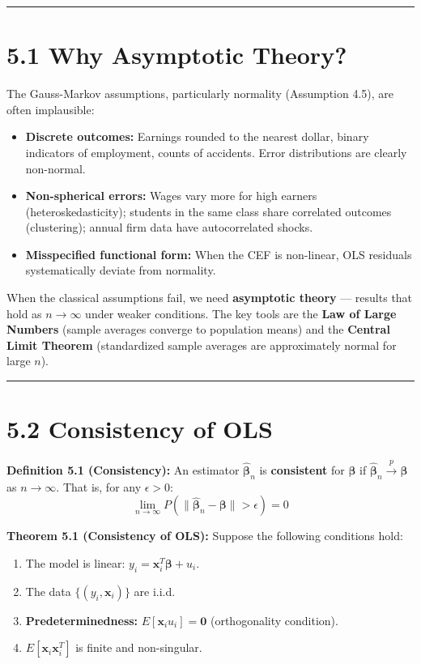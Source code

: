\medskip\hrule\medskip

\section{5.1 Why Asymptotic Theory?}

The Gauss-Markov assumptions, particularly normality (Assumption 4.5), are often implausible:

\begin{itemize}
\item \textbf{Discrete outcomes:} Earnings rounded to the nearest dollar, binary indicators of employment, counts of accidents. Error distributions are clearly non-normal.
\item \textbf{Non-spherical errors:} Wages vary more for high earners (heteroskedasticity); students in the same class share correlated outcomes (clustering); annual firm data have autocorrelated shocks.
\item \textbf{Misspecified functional form:} When the CEF is non-linear, OLS residuals systematically deviate from normality.
\end{itemize}

When the classical assumptions fail, we need \textbf{asymptotic theory} --- results that hold as $n \to \infty$ under weaker conditions. The key tools are the \textbf{Law of Large Numbers} (sample averages converge to population means) and the \textbf{Central Limit Theorem} (standardized sample averages are approximately normal for large $n$).

\medskip\hrule\medskip

\section{5.2 Consistency of OLS}

\textbf{Definition 5.1 (Consistency):} An estimator $\hat{\boldsymbol{\beta}}_n$ is \textbf{consistent} for $\boldsymbol{\beta}$ if $\hat{\boldsymbol{\beta}}_n \xrightarrow{p} \boldsymbol{\beta}$ as $n \to \infty$. That is, for any $\epsilon > 0$:
\[
\lim_{n \to \infty} P(\|\hat{\boldsymbol{\beta}}_n - \boldsymbol{\beta}\| > \epsilon) = 0
\]

\textbf{Theorem 5.1 (Consistency of OLS):} Suppose the following conditions hold:
\begin{enumerate}
\item The model is linear: $y_i = \mathbf{x}_i^T \boldsymbol{\beta} + u_i$.
\item The data $\{(y_i, \mathbf{x}_i)\}$ are i.i.d.
\item \textbf{Predeterminedness:} $E[\mathbf{x}_i u_i] = \mathbf{0}$ (orthogonality condition).
\item $E[\mathbf{x}_i \mathbf{x}_i^T]$ is finite and non-singular.
\end{enumerate}

